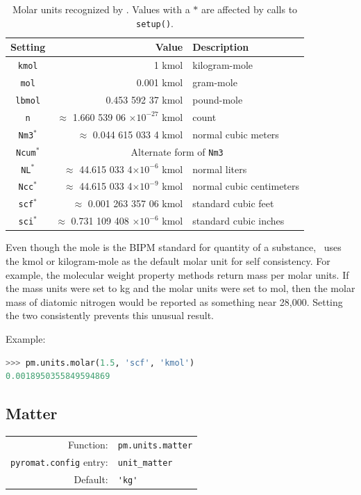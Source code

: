 \begin{table}
\centering
\caption{Molar units recognized by \PM.  Values with a $*$ are affected by calls to \texttt{setup()}.}\label{tab:molar}
\begin{tabular}{crl}
\hline
Setting & Value & Description\\
\hline
\verb|kmol| & 1 kmol & kilogram-mole\\
\verb|mol| & 0.001 kmol & gram-mole\\
\verb|lbmol| & 0.453 592 37 kmol & pound-mole\\
\verb|n| & $\approx$ 1.660 539 06 $\times 10^{-27}$ kmol & count \\
\verb|Nm3|$^*$ & $\approx$ 0.044 615 033 4 kmol & normal cubic meters\\
\verb|Ncum|$^*$ & \multicolumn{2}{c}{Alternate form of \texttt{Nm3}}\\
\verb|NL|$^*$ & $\approx$ 44.615 033 4$\times 10^{-6}$ kmol & normal liters\\
\verb|Ncc|$^*$ & $\approx$ 44.615 033 4$\times 10^{-9}$ kmol & normal cubic centimeters\\
\verb|scf|$^*$ & $\approx$ 0.001 263 357 06 kmol & standard cubic feet\\
\verb|sci|$^*$ & $\approx$ 0.731 109 408 $\times 10^{-6}$ kmol & standard cubic inches\\
\hline
\end{tabular}
\end{table}

Even though the mole is the BIPM standard for quantity of a substance, \PM\ uses the kmol or kilogram-mole as the default molar unit for self consistency.  For example, the molecular weight property methods return mass per molar units.  If the mass units were set to kg and the molar units were set to mol, then the molar mass of diatomic nitrogen would be reported as something near 28,000.  Setting the two consistently prevents this unusual result.


Example:
\begin{lstlisting}[language=Python]
>>> pm.units.molar(1.5, 'scf', 'kmol')
0.0018950355849594869
\end{lstlisting}


%
%

\subsection{Matter}\label{sec:units:matter}

\begin{tabular}{rl}
\hline
Function: & \verb|pm.units.matter|\\
\verb|pyromat.config| entry: & \verb|unit_matter|\\
Default: & \verb|'kg'|\\
\hline
\end{tabular}
\vspace{1em}


